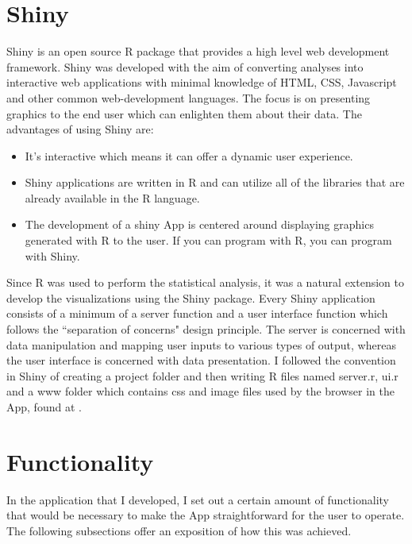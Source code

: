 \section{Shiny}
Shiny is an open source R package that provides a high level web development framework. Shiny was developed with the aim of converting analyses into interactive web applications with minimal knowledge of HTML, CSS, Javascript and other common web-development languages. The focus is on presenting graphics to the end user which can enlighten them about their data. The advantages of using Shiny are:
\begin{itemize}
	\item It's interactive which means it can offer a dynamic user experience. 
	\item Shiny applications are written in R and can utilize all of the libraries that are already available in the R language.
	\item The development of a shiny App is centered around displaying graphics generated with R to the user. If you can program with R, you can program with Shiny.
\end{itemize}
Since R was used to perform the statistical analysis, it was a natural extension to develop the visualizations using the Shiny package. Every Shiny application consists of a minimum of a server function and a user interface function which follows the ``separation of concerns" design principle. The server is concerned with data manipulation and mapping user inputs to various types of output, whereas the user interface is concerned with data presentation. I followed the convention in Shiny of creating a project folder and then writing R files named server.r, ui.r and a www folder which contains css and image files used by the browser in the App, found at \cite{ShinyServer}\cite{ShinyUI}.

\section{Functionality}
In the application that I developed, I set out a certain amount of functionality that would be necessary to make the App straightforward for the user to operate. The following subsections offer an exposition of how this was achieved.

